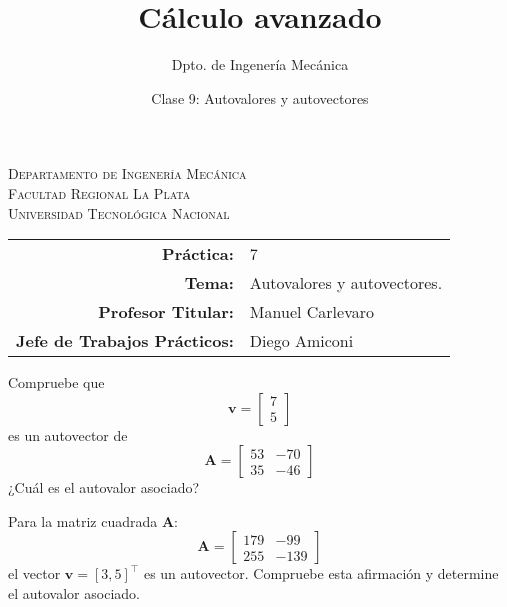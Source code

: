 \documentclass[11pt]{article}
\title{Cálculo avanzado}
\author{Dpto. de Ingenería Mecánica}
\date{Clase 9: Autovalores y autovectores}
\begin{document}

\begin{center}
\end{center} 

\begin{center}
\vspace{\baselineskip}
\Large{\textsc{Departamento de Ingenería Mecánica}} \\
\textsc{Facultad Regional La Plata} \\
\textsc{Universidad Tecnológica Nacional}
\end{center}


\begin{center}
\begin{tabular}{r l}
    \textbf{Práctica:} & 7 \\
 \textbf{Tema:} & Autovalores y autovectores. \\
 \textbf{Profesor Titular:} & Manuel Carlevaro \\
 \textbf{Jefe de Trabajos Prácticos:} & Diego Amiconi \\
\end{tabular}\end{center}

\vspace{1em}
\begin{question}
Compruebe que 
\[ \bm{v} = \begin{bmatrix} 7 \\ 5 \end{bmatrix} \]
es un autovector de 
\[ \bm{A} = 
    \begin{bmatrix}
        53 & -70 \\
        35 & -46
    \end{bmatrix} \]
    ¿Cuál es el autovalor asociado?
\end{question}

\begin{question} %

Para la matriz cuadrada $\bm{A}$:
    \[ \bm{A} = \begin{bmatrix} 179 & -99 \\
                255 & -139 \end{bmatrix} \]
el vector $\bm{v} = [3, 5]^{\intercal}$ es un autovector. Compruebe esta afirmación y determine el autovalor asociado.
\end{question}
\end{document}
